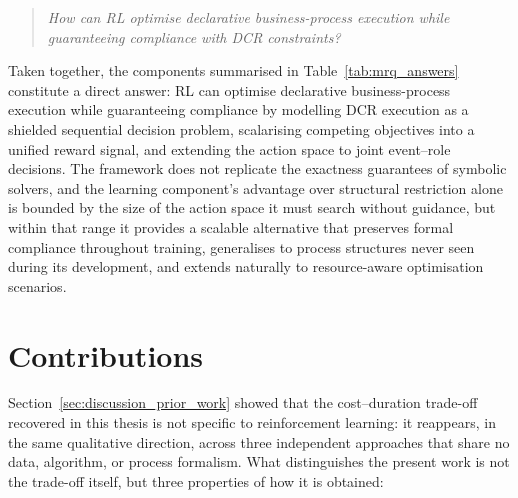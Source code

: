 \begin{quote}
\emph{How can \ac{RL} optimise declarative business-process execution while guaranteeing compliance with \ac{DCR} constraints?}
\end{quote}

Taken together, the components summarised in Table~\ref{tab:mrq_answers} constitute a direct answer: \ac{RL} can optimise declarative business-process execution while guaranteeing compliance by modelling \ac{DCR} execution as a shielded sequential decision problem, scalarising competing objectives into a unified reward signal, and extending the action space to joint event--role decisions. The framework does not replicate the exactness guarantees of symbolic solvers, and the learning component's advantage over structural restriction alone is bounded by the size of the action space it must search without guidance, but within that range it provides a scalable alternative that preserves formal compliance throughout training, generalises to process structures never seen during its development, and extends naturally to resource-aware optimisation scenarios.

\section{Contributions}
\label{sec:contributions}

Section~\ref{sec:discussion_prior_work} showed that the cost--duration trade-off recovered in this thesis is not specific to reinforcement learning: it reappears, in the same qualitative direction, across three independent approaches that share no data, algorithm, or process formalism. What distinguishes the present work is not the trade-off itself, but three properties of how it is obtained:

